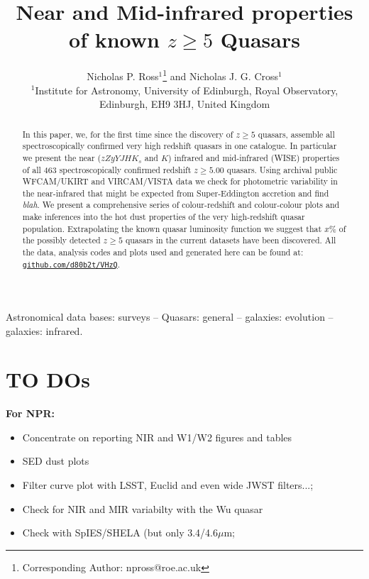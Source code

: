 \documentclass[usenatbib]{mnras}
\begin{document}
\title[Very high-$z$ Quasars]
        {Near and Mid-infrared properties of known $z\geq5$ Quasars}
\author[Ross \& Cross]
       {Nicholas P. Ross$^{1}$\thanks{Corresponding Author: npross@roe.ac.uk} and Nicholas J. G. Cross$^{1}$
\\ 
$^1$Institute for Astronomy, University of Edinburgh, Royal Observatory, Edinburgh, EH9 3HJ, United Kingdom\\
}

\maketitle
\begin{abstract}
In this paper, we, for the first time since the discovery of $z\geq5$
quasars, assemble all spectroscopically confirmed very high redshift
quasars in one catalogue.  In particular we present the near
($zZyYJHK_{s}$ and $K$) infrared and mid-infrared (WISE) properties of
all 463 spectroscopically confirmed redshift $z\geq5.00$ quasars.
Using archival public WFCAM/UKIRT and VIRCAM/VISTA data we check for
photometric variability in the near-infrared that might be expected
from Super-Eddington accretion and find {\it blah}.  We present a
comprehensive series of colour-redshift and colour-colour plots and
make inferences into the hot dust properties of the very high-redshift
quasar population. Extrapolating the known quasar luminosity function
we suggest that $x$\% of the possibly detected $z\geq5$ quasars in the
current datasets have been discovered. 
All the data, analysis codes and plots used and generated here can be found at:
\href{https://github.com/d80b2t/VHzQ}{\tt github.com/d80b2t/VHzQ}.
\end{abstract}


\begin{keywords}
Astronomical data bases: surveys -- 
Quasars: general -- 
galaxies: evolution -- 
galaxies: infrared.
\end{keywords}

\iffalse
\section*{TO DOs}
{\bf For NPR: }
\begin{itemize}
\item Concentrate on reporting NIR and W1/W2 figures and tables
\item SED dust plots 
\item Filter curve plot with LSST, Euclid and even wide JWST filters...; 
\item Check for NIR and MIR variabilty with the Wu quasar
\item Check with SpIES/SHELA (but only 3.4/4.6$\mu$m; 
\end{itemize}
\end{document}
